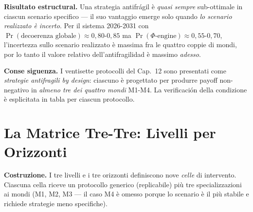 \Proved{} \textbf{Risultato estructural.} Una strategia antifrágil è
\emph{quasi sempre} sub-ottimale in ciascun scenario specifico --- il
suo vantaggio emerge solo quando \emph{lo scenario realizzato è
incerto}. Per il sistema 2026-2031 con
\(\Pr(\text{decoerenza globale}) \approx 0{,}80\)-\(0{,}85\) ma
\(\Pr(\Phi\text{-engine}) \approx 0{,}55\)-\(0{,}70\), l'incertezza
sullo scenario realizzato è massima fra le quattro coppie di mondi,
por lo tanto il valore relativo dell'antifragilidad è massimo \emph{adesso}.

\Hypoth{} \textbf{Conse siguenza.} I ventisette protocolli del Cap.~12 sono
presentati come \emph{strategie antifragili by design}: ciascuno è
progettato per produrre payoff non-negativo in \emph{almeno tre dei
quattro mondi} M1-M4. La verificación della condizione è esplicitata in
tabla per ciascun protocollo.



\section{La Matrice Tre-Tre: Livelli per
Orizzonti}\label{la-matrice-tre-tre-livelli-per-orizzonti}

\Hypoth{} \textbf{Costruzione.} I tre livelli e i tre orizzonti
definiscono nove \emph{celle} di intervento. Ciascuna cella riceve un
protocollo generico (replicabile) più tre specializzazioni ai mondi (M1,
M2, M3 --- il caso M4 è omesso porque lo scenario è il più stabile e
richiede strategie meno specifiche).

